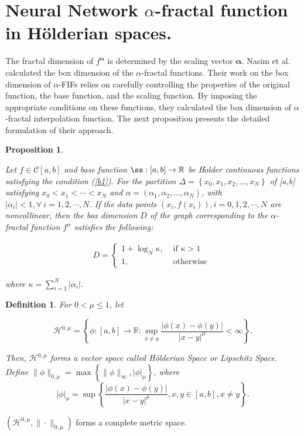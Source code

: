 \documentclass{article}[12pt, a4]
\newtheorem{definition}{\large Definition}[section]
\newtheorem{proposition}{\large Proposition}[section]
\begin{document}
	\section{Neural Network $\alpha$-fractal function in H\"{o}lderian spaces.}\label{sec4}
	
	The fractal dimension of \(f^{\boldsymbol{\alpha}}\) is determined by the scaling vector \(\boldsymbol{\alpha}\).
	Nasim et al. \cite{nasim} calculated the box dimension of the \(\alpha\)-fractal functions. Their work on the box dimension of $\alpha$-FIFs relies on carefully controlling the properties of the original function, the base function, and the scaling function. By imposing the appropriate conditions on these functions, they calculated the box dimension of $\alpha$-fractal interpolation function. The next proposition presents the detailed formulation of their approach.\\
	\begin{proposition}\label{naseem}
		
		Let $f \in \mathcal{C}[a,b]$ and base function $\ss: [a,b] \rightarrow \mathbb{R}$ be H$\ddot{o}$lder continuous functions satisfying the condition (\ref{b1}). For the partition  $\Delta=\left\{x_{0}, x_{1}, x_{2}, \ldots, x_{N}\right\}$ of [a,b] satisfying $x_{0}<x_{1}<\cdots<x_{N}$ and $\alpha=\left(\alpha_{1}, \alpha_{2}, \ldots, \alpha_{N}\right)$, with $|\alpha_{i}|<1, \forall~i=1,2,\cdots,N$. If the data points $\left(x_{i}, f\left(x_{i}\right)\right), i =0, 1,2,\cdots,N$ are noncollinear, then the box dimension $D$ of the graph corresponding to the  $\alpha$-fractal function $f^{\alpha}$ satisfies the following:
		
		\begin{align*}
			D= \begin{cases}1+\log _{N} \kappa, & \text { if } \kappa>1 \\ 1, & \text { otherwise }\end{cases}
		\end{align*}
		
		where $\kappa=\displaystyle \sum_{i=1}^{N}\left|\alpha_{i}\right|$.
	\end{proposition} 
	
	\begin{definition}
		For $0<\mu \leq 1$, let
		
		
		\begin{equation*}
			\mathcal{H}^{0,\mu}=\left\{\phi: [a,b] \rightarrow \mathbb{R}: \sup _{x \neq y} \frac{|\phi(x)-\phi(y)|}{|x-y|^{\mu}}<\infty\right\}.
		\end{equation*}
		
		Then, $\mathcal{H}^{0,\mu}$ forms a vector space called H\"{o}lderian Space or Lipschitz Space.\\
		Define $\|\phi\|_{0, \mu}=\max \left\{\|\phi\|_{\infty},|\phi|_{\mu}\right\}$, where
		\begin{equation*}
			|\phi|_{\mu}=\sup \left\{\frac{|\phi(x)-\phi(y)|}{|x-y|^{\mu}}, x, y \in [a,b], x \neq y\right\}.
		\end{equation*}
	\end{definition}
	$\left(\mathcal{H}^{0,\mu},\|\cdot\|_{0, \mu}\right)$ forms a complete metric space.\\
	
\end{document}
